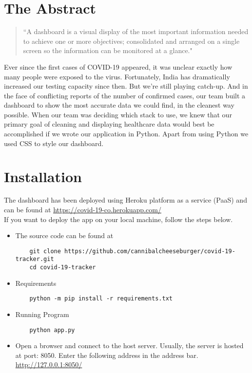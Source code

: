 \documentclass[11pt,a4paper]{report}
\begin{document}
    \renewcommand{\familydefault}{\rmdefault}
\section*{The Abstract}

\begin{quote}
``A dashboard is a visual display of the most important information needed to achieve one or more objectives; consolidated and arranged on a single screen so the information can be monitored at a glance."
\end{quote}
    Ever since the first cases of COVID-19 appeared, it was unclear exactly how many people were exposed to the virus. Fortunately, India has dramatically increased our testing capacity since then. But we’re still playing catch-up. And in the face of conflicting reports of the number of confirmed cases, our team built a dashboard to show the most accurate data we could find, in the cleanest way possible. When our team was deciding which stack to use, we knew that our primary goal of cleaning and displaying healthcare data would best be accomplished if we wrote our application in Python. Apart from using Python we used CSS to style our dashboard. 

\pagebreak
\section*{Installation}

    The dashboard has been deployed using Heroku platform as a service (PaaS) and can be found at \url{https://covid-19-co.herokuapp.com/}\\
    
    
    \noindent If you want to deploy the app on your local machine, follow the steps below.

    \begin{itemize}
    \item The source code can be found at 
    
    \begin{lstlisting}
    git clone https://github.com/cannibalcheeseburger/covid-19-tracker.git
    cd covid-19-tracker
    \end{lstlisting}

    \item Requirements
    \begin{lstlisting}
    python -m pip install -r requirements.txt
    \end{lstlisting}

    \item Running Program
    \begin{lstlisting}
    python app.py
    \end{lstlisting}

    \item Open a browser and connect to the host server. Usually, the server is hosted at port: 8050. Enter the following address in the address bar. \url{http://127.0.0.1:8050/}

\end{itemize}
    \pagebreak
\end{document}
